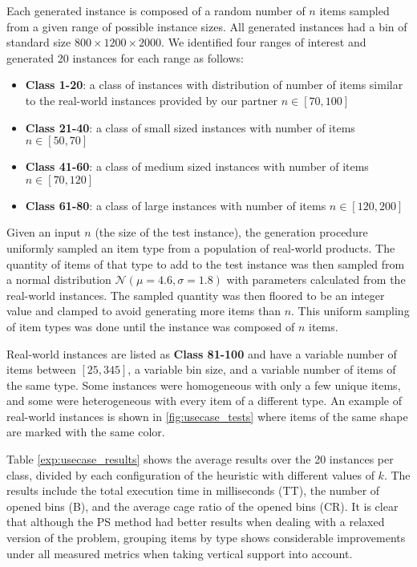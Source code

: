 Each generated instance is composed of a random number of $n$ items sampled from a given range of possible instance sizes. All generated instances had a bin of standard size $800 \times 1200 \times 2000$.
We identified four ranges of interest and generated 20 instances for each range as follows:
\begin{itemize}
    \item \textbf{Class 1-20}: a class of instances with distribution of number of items similar to the real-world instances provided by our partner $n \in [70,100]$
    \item \textbf{Class 21-40}: a class of small sized instances with number of items $n \in [50,70]$
    \item \textbf{Class 41-60}: a class of medium sized instances with number of items $n \in [70,120]$
    \item \textbf{Class 61-80}: a class of large instances with number of items $n \in [120,200]$
\end{itemize}

Given an input $n$ (the size of the test instance), the generation procedure uniformly sampled an item type from a population of real-world products.
The quantity of items of that type to add to the test instance was then sampled from a normal distribution $\mathcal{N}(\mu = 4.6, \sigma = 1.8)$ with parameters calculated from the real-world instances.
The sampled quantity was then floored to be an integer value and clamped to avoid generating more items than $n$.
This uniform sampling of item types was done until the instance was composed of $n$ items.

Real-world instances are listed as \textbf{Class 81-100} and have a variable number of items between $[25, 345]$, a variable bin size, and a variable number of items of the same type. Some instances were homogeneous with only a few unique items, and some were heterogeneous with every item of a different type.
An example of real-world instances is shown in \cref{fig:usecase_tests} where items of the same shape are marked with the same color.

Table \ref{exp:usecase_results} shows the average results over the 20 instances per class, divided by each configuration of the heuristic with different values of $k$.
The results include the total execution time in milliseconds (TT), the number of opened bins (B), and the average cage ratio of the opened bins (CR).
It is clear that although the PS method had better results when dealing with a relaxed version of the problem, grouping items by type shows considerable improvements under all measured metrics when taking vertical support into account.

